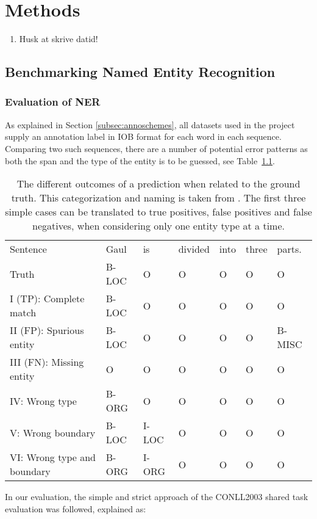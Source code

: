 \documentclass[main.tex]{subfiles}
\begin{document}
\chapter{Methods}
\label{chap:methods}
\begin{enumerate}
    \item Husk at skrive datid!
\end{enumerate}

\section{Benchmarking Named Entity Recognition}
\subsection{Evaluation of NER}
\label{subsec:nereval}
As explained in Section \ref{subsec:annoschemes}, all datasets used in the project supply an annotation label in IOB format \cite{ramshaw1995IOB} for each word in each sequence.
Comparing two such sequences, there are a number of potential error patterns as both the span and the type of the entity is to be guessed, see Table~\ref{tab:eval}.
\begin{table}[H]
    \footnotesize
    \centering
    \begin{tabular}{l|llllll}
        Sentence                    & Gaul & is & divided & into & three & parts.\\
        Truth                       & B-LOC & O & O & O & O & O \\\hline
        I (TP): Complete match      & B-LOC & O & O & O & O & O \\
        II (FP): Spurious entity    & B-LOC & O & O & O & O & B-MISC \\
        III (FN): Missing entity    & O     & O & O & O & O & O \\
        IV: Wrong type              & B-ORG & O & O & O & O & O \\
        V: Wrong boundary           & B-LOC & I-LOC & O & O & O & O \\
        VI: Wrong type and boundary & B-ORG & I-ORG & O & O & O & O
    \end{tabular}
    \caption{
        The different outcomes of a prediction when related to the ground truth.
        This categorization and naming is taken from \cite{batista2018eval}.
        The first three simple cases can be translated to true positives, false positives and false negatives, when considering only one entity type at a time.
    }
    \label{tab:eval}
\end{table}\noindent
In our evaluation, the simple and strict approach of the CONLL2003 shared task evaluation was followed, explained as:
\end{document}
